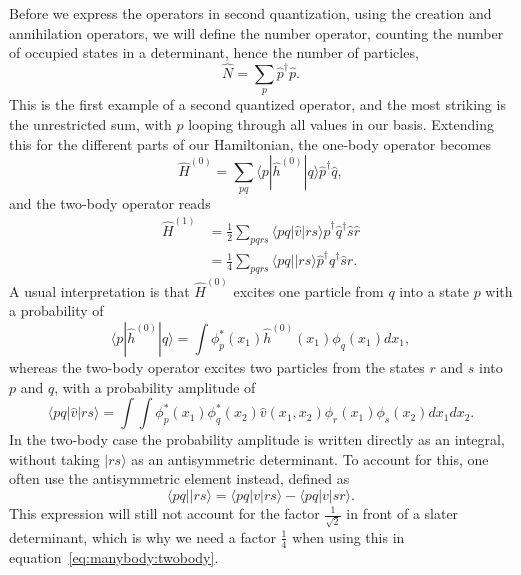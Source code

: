 Before we express the operators in second quantization, using the creation and annihilation operators, we will define the number operator, counting the number of occupied states in a determinant, hence the number of particles,
\begin{equation}
\label{eq:manybody:numberoperator}
\hat{N} = \sum_p \hat{p}^{\dagger} \hat{p} .
\end{equation}
This is the first example of a second quantized operator, and the most striking is the unrestricted sum, with $p$ looping through all values in our basis.
Extending this for the different parts of our Hamiltonian, the one-body operator becomes
\begin{equation}
\hat{H}^{(0)} = \sum_{pq} \langle p| \hat{h}^{(0)} |q\rangle \hat{p}^{\dagger} \hat{q},
\end{equation}
and the two-body operator reads
\begin{equation}
\label{eq:manybody:twobody}
\begin{split}
\hat{H}^{(1)} &= \frac{1}{2} \sum_{pqrs} \langle pq | \hat{v} | rs \rangle 
\hat{p}^{\dagger} \hat{q}^{\dagger} \hat{s}\hat{r} \\
&= \frac{1}{4} \sum_{pqrs} \langle pq ||rs \rangle \hat{p}^{\dagger}
\hat{q}^{\dagger} \hat{s} \hat{r} .
\end{split}
\end{equation}
A usual interpretation is that $\hat{H}^{(0)}$ excites one particle from $q$ into a state
$p$ with a probability of
\begin{equation}
\langle p| \hat{h}^{(0)} |q\rangle = \int \phi_p^{*}(x_1) \hat{h}^{(0)}(x_1)
\phi_q(x_1) dx_1 ,
\end{equation}
whereas the two-body operator excites two particles from the states $r$ and $s$ into
$p$ and $q$, with a probability amplitude of
\begin{equation}
\langle pq | \hat{v} | rs \rangle =
\int \int \phi_p^{*}(x_1)\phi_q^{*}(x_2) \hat{v}(x_1,x_2) \phi_r(x_1)
\phi_s(x_2) dx_1 dx_2 .
\end{equation}
In the two-body case the probability amplitude is written directly as an integral,
without taking $|rs\rangle$ as an antisymmetric determinant.
To account for this, one often use the antisymmetric element instead, defined as
\begin{equation}
\label{eq:manybody:v_elem}
\langle pq | | rs \rangle = \langle pq |v| rs \rangle - \langle pq |v| sr
\rangle .
\end{equation}
This expression will still not account for the factor $\frac{1}{\sqrt{2}}$ in
front of a slater determinant, which is why we need a factor $\frac{1}{4}$ when
using this in equation~\eqref{eq:manybody:twobody}.

